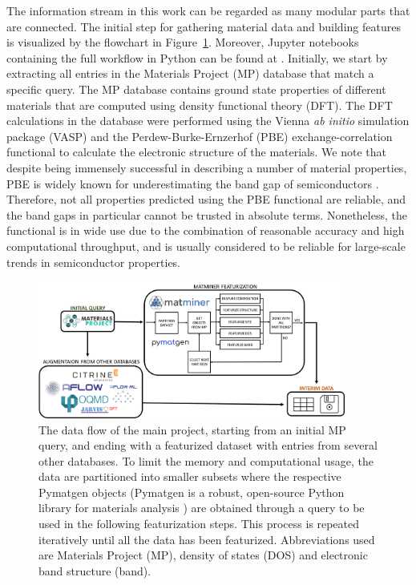 \documentclass[superscriptaddress,unsortedaddress,
 amsmath,amssymb,
 aps,
]{revtex4-2}
\begin{document}
The information stream in this work can be regarded as many modular parts that are connected. 
The initial step for gathering material data and building features is visualized by the  flowchart in Figure~\ref{fig:flowchart}. Moreover, Jupyter notebooks containing the full
workflow in Python can be found at \cite{Ohebbi2021}.
Initially, we start by extracting all entries in the Materials Project (MP) database that match a specific query. 
The MP database contains ground state properties of different materials that are computed using density functional theory (DFT). The DFT calculations in the database were performed using the Vienna {\em ab initio} simulation package (VASP) \cite{Kresse1996} and the Perdew-Burke-Ernzerhof (PBE) \cite{Perdew1996} exchange-correlation functional to calculate the electronic structure of the materials. 
We note that despite being immensely successful in describing a number of material properties, PBE is widely known for underestimating the band gap of semiconductors \cite{Freysoldt2014}. Therefore, not all properties predicted using the PBE functional are reliable, and the band gaps in particular cannot be trusted in absolute terms. Nonetheless, the functional is in wide use due to the combination of reasonable accuracy and high computational throughput, and is usually considered to be reliable for large-scale trends in semiconductor properties. 

\begin{figure}[t]
    \centering
    \includegraphics[width=0.9\textwidth]{figures/flow_chart_2.png}
    \caption{The data flow of the main project, starting from an initial MP query, and ending with a featurized dataset with entries from several other databases. To limit the memory and computational usage, the data are partitioned into smaller subsets where the respective Pymatgen objects  
    (Pymatgen is a robust, open-source Python library for materials analysis \cite{pymatgen}) 
    are obtained through a query to be used in the following featurization steps. This process is repeated iteratively until all the data has been featurized. Abbreviations used are Materials Project (MP), density of states (DOS) and electronic band structure (band).
    }
    \label{fig:flowchart}
\end{figure}
\end{document}
